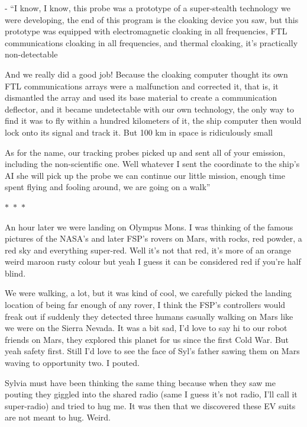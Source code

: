 \documentclass[colorlinks,12pt,a4paper]{book}
\newcommand\sep{\begin{center}
  \boldmath $\ast$~$\ast$~$\ast$
\end{center}}
\begin{document}
- “I know, I know, this probe was a prototype of a super-stealth technology we were developing, 
the end of this program is the cloaking device you saw, but this prototype was equipped with electromagnetic 
cloaking in all frequencies, FTL communications cloaking in all frequencies, and thermal cloaking, 
it's practically non-detectable \newline

And we really did a good job! Because the cloaking computer thought its own FTL 
communications arrays were a malfunction and corrected it, that is, it dismantled the 
array and used its base material to create a communication deflector, and it became undetectable with 
our own technology, the only way to find it was to fly within a hundred kilometers of it, the ship computer then would
 lock onto its signal and track it. But 100 km in space is ridiculously small\newline

 As for the name, our tracking probes picked up and sent all of your 
 emission, including the non-scientific one. Well whatever I sent the coordinate 
 to the ship's AI she will pick up the probe we can continue our little mission, 
 enough time spent flying and fooling around, we are going on a walk”

\sep

An hour later we were landing on Olympus Mons. I was thinking of the famous pictures of the NASA's 
and later FSP's rovers on Mars, with rocks, red powder, a red sky and everything super-red.
Well it's not that red, it's more of an orange weird maroon rusty colour but yeah I guess it 
can be considered red if you're half blind.\par
\bigskip

We were walking, a lot, but it was kind of cool, we carefully picked the landing location of being 
far enough of any rover, I think the FSP's controllers would freak out if suddenly they detected three 
humans casually walking on Mars like we were on the Sierra Nevada. It was a bit sad, I'd love to say 
hi to our robot friends on Mars, they explored this planet for us since the first Cold War. 
But yeah safety first. Still I'd love to see the face of Syl's father sawing them on Mars waving 
to opportunity two. I pouted.\par
\bigskip

Sylvia must have been thinking the same thing because when they saw me pouting they giggled into 
the shared radio (same I guess it's not radio, I'll call it super-radio) and tried to hug me. It was 
then that we discovered these EV suits are not meant to hug. Weird.
\end{document}
